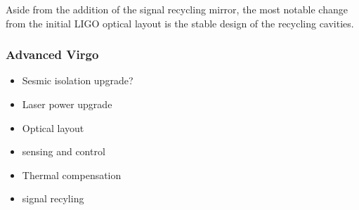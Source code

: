 Aside from the addition of the signal recycling mirror, the most notable change from the initial LIGO optical 
layout is the stable design of the recycling cavities.


\subsubsection{Advanced Virgo}
\begin{itemize}
\item Sesmic isolation upgrade?
\item Laser power upgrade
\item Optical layout
\item sensing and control
\item Thermal compensation
\item signal recyling
\end{itemize}

